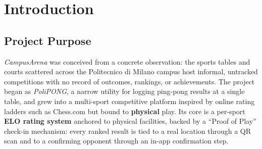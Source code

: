\documentclass{configurations/polimi3i_thesis}
\renewcommand{\_}{\textunderscore\allowbreak}
\let\cleardoublepage\clearpage
\begin{document}


\pagestyle{empty} %
\frontmatter %


\startpreamble
\setcounter{page}{1} %


\thispagestyle{empty}
\tableofcontents %
\thispagestyle{empty}
\cleardoublepage

\mainmatter %


\chapter{Introduction}
\label{ch:introduction}

\section{Project Purpose}
\label{sec:project_purpose}

\textit{CampusArena} was conceived from a concrete observation: the sports tables and courts scattered across the Politecnico di Milano campus host informal, untracked competitions with no record of outcomes, rankings, or achievements. The project began as \textit{PoliPONG}, a narrow utility for logging ping-pong results at a single table, and grew into a multi-sport competitive platform inspired by online rating ladders such as Chess.com but bound to \textbf{physical} play. Its core is a per-sport \textbf{ELO rating system} anchored to physical facilities, backed by a ``Proof of Play'' check-in mechanism: every ranked result is tied to a real location through a QR scan and to a confirming opponent through an in-app confirmation step.
\end{document}
